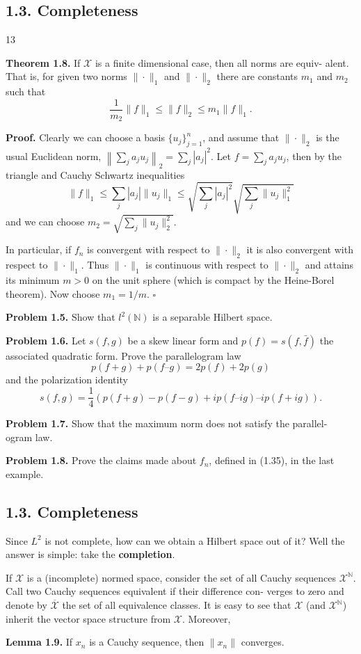 \subsection*{1.3. Completeness}
\hfill 13

\noindent\textbf{Theorem 1.8.} If $\mathcal{X}$ is a finite dimensional case, then all norms are equiv-
alent. That is, for given two norms $\|\cdot\|_1$ and $\|\cdot\|_2$ there are constants $m_1$
and $m_2$ such that
\[
\frac{1}{m_2} \|f\|_1 \leq \|f\|_2 \leq m_1\|f\|_1.
\tag{1.36}
\]

\noindent\textbf{Proof.} Clearly we can choose a basis $\{u_j\}_{j=1}^n$, and assume that $\|\cdot\|_2$ is
the usual Euclidean norm, $\left\|\sum_j a_j u_j\right\|_2 = \sum_j |a_j|^2$. Let $f = \sum_j a_j u_j$, then
by the triangle and Cauchy Schwartz inequalities
\[
\|f\|_1 \leq \sum_j |a_j| \|u_j\|_1 \leq \sqrt{\sum_j |a_j|^2} \sqrt{\sum_j \|u_j\|_1^2}
\tag{1.37}
\]
and we can choose $m_2 = \sqrt{\sum_j \|u_j\|_2^2}$.

In particular, if $f_n$ is convergent with respect to $\|\cdot\|_2$ it is also convergent
with respect to $\|\cdot\|_1$. Thus $\|\cdot\|_1$ is continuous with respect to $\|\cdot\|_2$ and attains
its minimum $m > 0$ on the unit sphere (which is compact by the Heine-Borel
theorem). Now choose $m_1 = 1/m$. $\square$

\noindent\textbf{Problem 1.5.} Show that $l^2(\mathbb{N})$ is a separable Hilbert space.

\noindent\textbf{Problem 1.6.} Let $s(f,g)$ be a skew linear form and $p(f) = s(f, \bar{f})$ the
associated quadratic form. Prove the parallelogram law
\[
p(f + g) + p(f – g) = 2p(f) + 2p(g)
\tag{1.38}
\]
and the polarization identity
\[
s(f,g) = \frac{1}{4} \left( p(f+g) - p(f - g) + ip(f – ig) – ip(f + ig) \right).
\tag{1.39}
\]

\noindent\textbf{Problem 1.7.} Show that the maximum norm does not satisfy the parallel-
ogram law.

\noindent\textbf{Problem 1.8.} Prove the claims made about $f_n$, defined in (1.35), in the
last example.

\subsection*{1.3. Completeness}

Since $L^2$ is not complete, how can we obtain a Hilbert space out of it? Well
the answer is simple: take the \textbf{completion}.

If $\mathcal{X}$ is a (incomplete) normed space, consider the set of all Cauchy
sequences $\mathcal{X}^\mathbb{N}$. Call two Cauchy sequences equivalent if their difference con-
verges to zero and denote by $\overline{\mathcal{X}}$ the set of all equivalence classes. It is easy
to see that $\mathcal{X}$ (and $\mathcal{X}^\mathbb{N}$) inherit the vector space structure from $\mathcal{X}$. Moreover,

\noindent\textbf{Lemma 1.9.} If $x_n$ is a Cauchy sequence, then $\|x_n\|$ converges.